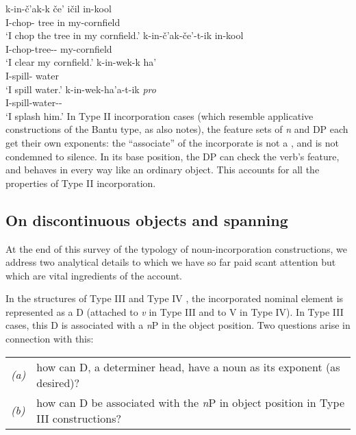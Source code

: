 \documentclass[output=paper]{langsci/langscibook}
\begin{document}
\begin{refcontext}
\ea\label{18}
    \ea \gll k-in-\v{c}'ak-k \v{c}e' i\v{c}il in-kool\\
    \Incmpl{}\normalfont{-}I-chop-\Ipfv{} tree in my-cornfield\\
    \glt \enquote*{I chop the tree in my cornfield.}
    \ex \gll k-in-\v{c}'ak-\v{c}e'-t-ik in-kool\\
    \Incmpl{}\normalfont{-}I-chop-tree-\Tr-\Ipfv{} my-cornfield\\
    \glt \enquote*{I clear my cornfield.}
    \z
\z
\newpage
\ea\label{19}
    \ea \gll k-in-wek-k ha'\\
    \Incmpl{}\normalfont{-}I-spill-\Ipfv{} water\\
    \glt \enquote*{I spill water.}
    \ex \gll k-in-wek-ha'a-t-ik \emph{pro}\\
    \Incmpl{}\normalfont{-}I-spill-water-\Tr-\Ipfv{}\\
    \glt \enquote*{I splash him.}
    \z
\z
In Type II incorporation cases (which resemble applicative constructions of the
Bantu type, as \citet{rosen89} also notes), the feature sets of \emph{n} and DP
each get their own exponents: the \enquote{associate} of the incorporate is
not a , and is not condemned to silence. In its base position,
the DP can check the verb's  feature, and behaves in every way
like an ordinary object. This accounts for all the properties of Type II
incorporation.

\subsection{On discontinuous objects and spanning}
\label{sec:16.2.4}
At the end of this survey of the typology of noun-incorporation constructions, we address two analytical
details to which we have so far paid scant attention but which are vital ingredients of the account.


In the structures of Type III and Type IV , the incorporated nominal
element is represented as a D (attached to \emph{v} in Type III and to V in Type IV). In Type III cases, this
D is associated with a \emph{n}P in the object position. Two questions arise in connection with this:

\vspace{1ex}
\begin{tabularx}{\textwidth}{lX}
\emph{(a)} & how can D, a determiner head, have a noun as its exponent (as desired)?\\
\emph{(b)} & how can D be associated with the \emph{n}P in object position in Type III constructions?\\
\end{tabularx}



\end{refcontext}
\end{document}

